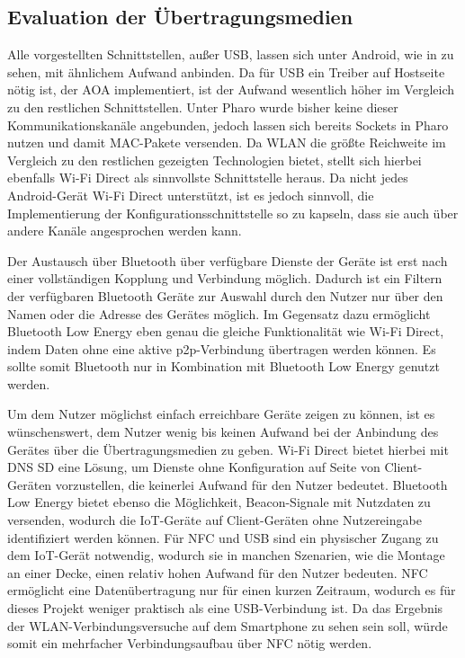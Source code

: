     \subsection{Evaluation der Übertragungsmedien}
    Alle vorgestellten Schnittstellen, außer USB, lassen sich unter Android, wie in \cite{AI-test-repository} zu sehen, mit ähnlichem Aufwand anbinden.
    Da für USB ein Treiber auf Hostseite nötig ist, der AOA implementiert, ist der Aufwand wesentlich höher im Vergleich zu den restlichen Schnittstellen.
    Unter Pharo wurde bisher keine dieser Kommunikationskanäle angebunden,
    jedoch lassen sich bereits Sockets in Pharo nutzen und damit MAC-Pakete versenden.
    Da WLAN die größte Reichweite im Vergleich zu den restlichen gezeigten Technologien bietet, stellt sich hierbei ebenfalls Wi-Fi Direct als sinnvollste Schnittstelle heraus.
    Da nicht jedes Android-Gerät Wi-Fi Direct unterstützt, ist es jedoch sinnvoll, die Implementierung der Konfigurationsschnittstelle so zu kapseln,
    dass sie auch über andere Kanäle angesprochen werden kann.
    
    Der Austausch über Bluetooth über verfügbare Dienste der Geräte ist erst nach einer vollständigen Kopplung und Verbindung möglich.
    Dadurch ist ein Filtern der verfügbaren Bluetooth Geräte zur Auswahl durch den Nutzer nur über den Namen oder die Adresse des Gerätes möglich.
    Im Gegensatz dazu ermöglicht Bluetooth Low Energy eben genau die gleiche Funktionalität wie Wi-Fi Direct, indem Daten ohne eine aktive p2p-Verbindung übertragen werden können. Es sollte somit Bluetooth nur in Kombination mit Bluetooth Low Energy genutzt werden.

    Um dem Nutzer möglichst einfach erreichbare Geräte zeigen zu können, ist es wünschenswert, dem Nutzer wenig bis keinen Aufwand bei der Anbindung des Gerätes über die Übertragungsmedien zu geben.
    Wi-Fi Direct bietet hierbei mit DNS SD eine Lösung, um Dienste ohne Konfiguration auf Seite von Client-Geräten vorzustellen, die keinerlei Aufwand für den Nutzer bedeutet.
    Bluetooth Low Energy bietet ebenso die Möglichkeit, Beacon-Signale mit Nutzdaten zu versenden, wodurch die IoT-Geräte auf Client-Geräten ohne Nutzereingabe identifiziert werden können.
    Für NFC und USB sind ein physischer Zugang zu dem IoT-Gerät notwendig, wodurch sie in manchen Szenarien, wie die Montage an einer Decke, einen relativ hohen Aufwand für den Nutzer bedeuten.
    NFC ermöglicht eine \linebreak Datenübertragung nur für einen kurzen Zeitraum, wodurch es für dieses Projekt weniger praktisch als eine USB-Verbindung ist.
    Da das Ergebnis der WLAN-\linebreak Verbindungsversuche auf dem Smartphone zu sehen sein soll, würde somit ein \linebreak mehrfacher Verbindungsaufbau über NFC nötig werden.
